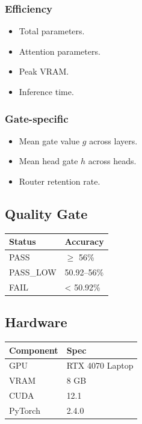 \subsubsection{Efficiency}
\begin{itemize}
\item Total parameters.
\item Attention parameters.
\item Peak VRAM.
\item Inference time.

\end{itemize}
\subsubsection{Gate-specific}
\begin{itemize}
\item Mean gate value $g$ across layers.
\item Mean head gate $h$ across heads.
\item Router retention rate.

\end{itemize}
\subsection{Quality Gate}

\begin{table}[H]
\centering
\small
\begin{tabular}{ll}
\toprule
\textbf{Status} & \textbf{Accuracy} \\
\midrule
PASS & $\ge$ 56\% \\
PASS\_LOW & 50.92--56\% \\
FAIL & \textless{} 50.92\% \\
\bottomrule
\end{tabular}
\end{table}

\subsection{Hardware}

\begin{table}[H]
\centering
\small
\begin{tabular}{ll}
\toprule
\textbf{Component} & \textbf{Spec} \\
\midrule
GPU & RTX 4070 Laptop \\
VRAM & 8 GB \\
CUDA & 12.1 \\
PyTorch & 2.4.0 \\
\bottomrule
\end{tabular}
\end{table}

